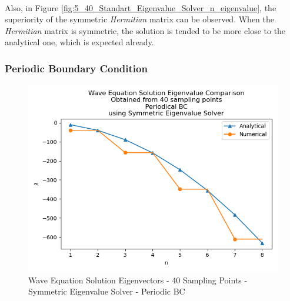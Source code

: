 \documentclass[letterpaper,12pt]{article}
\begin{document}
\paragraph{} Also, in Figure \ref{fig:5_40_Standart_Eigenvalue_Solver_n_eigenvalue}, the superiority of the symmetric \textit{Hermitian} matrix can be observed. When the \textit{Hermitian} matrix is symmetric, the solution is tended to be more close to the analytical one, which is expected already.

\subsubsection{Periodic Boundary Condition}

\begin{figure}[H]
\centerline{\includegraphics[width=\linewidth]{figures/6_40_Symmetric_Eigenvalue_Solver_p_eigenvalue.png}}
\caption{Wave Equation Solution Eigenvectors - 40 Sampling Points - Symmetric Eigenvalue Solver - Periodic BC}
\label{fig:6_40_Symmetric_Eigenvalue_Solver_p_eigenvalue}
\end{figure}
\end{document}
